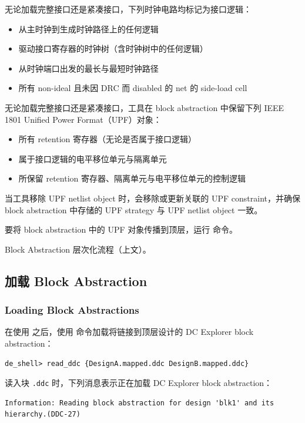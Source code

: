 无论加载完整接口还是紧凑接口，下列时钟电路均标记为接口逻辑：
\begin{itemize}
  \item 从主时钟到生成时钟路径上的任何逻辑
  \item 驱动接口寄存器的时钟树（含时钟树中的任何逻辑）
  \item 从时钟端口出发的最长与最短时钟路径
  \item 所有 non-ideal 且未因 DRC 而 disabled 的 net 的 side-load cell
\end{itemize}

无论加载完整接口还是紧凑接口，工具在 block abstraction 中保留下列 IEEE 1801 Unified Power Format（UPF）对象：
\begin{itemize}
  \item 所有 retention 寄存器（无论是否属于接口逻辑）
  \item 属于接口逻辑的电平移位单元与隔离单元
  \item 所保留 retention 寄存器、隔离单元与电平移位单元的控制逻辑
\end{itemize}

当工具移除 UPF netlist object 时，会移除或更新关联的 UPF constraint，并确保 block abstraction 中存储的 UPF strategy 与 UPF netlist object 一致。

要将 block abstraction 中的 UPF 对象传播到顶层，运行  命令。

\begin{seeAlsoBox}
Block Abstraction 层次化流程（上文）。
\end{seeAlsoBox}

\subsection{加载 Block Abstraction}
\subsubsection*{Loading Block Abstractions}

在使用  之后，使用  命令加载将链接到顶层设计的 DC Explorer block abstraction：
\begin{lstlisting}
de_shell> read_ddc {DesignA.mapped.ddc DesignB.mapped.ddc}
\end{lstlisting}

读入块 \texttt{.ddc} 时，下列消息表示正在加载 DC Explorer block abstraction：
\begin{lstlisting}
Information: Reading block abstraction for design 'blk1' and its
hierarchy.(DDC-27)
\end{lstlisting}

